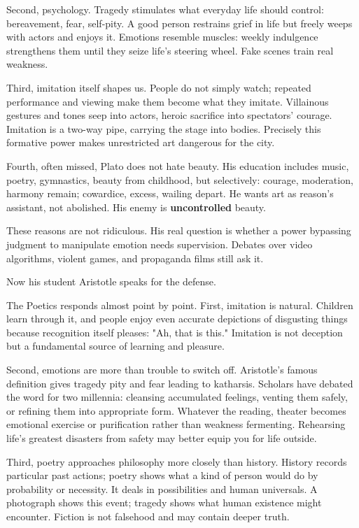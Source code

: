 Second, psychology. Tragedy stimulates what everyday life should control: bereavement, fear, self-pity. A good person restrains grief in life but freely weeps with actors and enjoys it. Emotions resemble muscles: weekly indulgence strengthens them until they seize life's steering wheel. Fake scenes train real weakness.

Third, imitation itself shapes us. People do not simply watch; repeated performance and viewing make them become what they imitate. Villainous gestures and tones seep into actors, heroic sacrifice into spectators' courage. Imitation is a two-way pipe, carrying the stage into bodies. Precisely this formative power makes unrestricted art dangerous for the city.

Fourth, often missed, Plato does not hate beauty. His education includes music, poetry, gymnastics, beauty from childhood, but selectively: courage, moderation, harmony remain; cowardice, excess, wailing depart. He wants art as reason's assistant, not abolished. His enemy is \textbf{uncontrolled} beauty.

These reasons are not ridiculous. His real question is whether a power bypassing judgment to manipulate emotion needs supervision. Debates over video algorithms, violent games, and propaganda films still ask it.

Now his student Aristotle speaks for the defense.

The Poetics responds almost point by point. First, imitation is natural. Children learn through it, and people enjoy even accurate depictions of disgusting things because recognition itself pleases: "Ah, that is this." Imitation is not deception but a fundamental source of learning and pleasure.

Second, emotions are more than trouble to switch off. Aristotle's famous definition gives tragedy pity and fear leading to katharsis. Scholars have debated the word for two millennia: cleansing accumulated feelings, venting them safely, or refining them into appropriate form. Whatever the reading, theater becomes emotional exercise or purification rather than weakness fermenting. Rehearsing life's greatest disasters from safety may better equip you for life outside.

Third, poetry approaches philosophy more closely than history. History records particular past actions; poetry shows what a kind of person would do by probability or necessity. It deals in possibilities and human universals. A photograph shows this event; tragedy shows what human existence might encounter. Fiction is not falsehood and may contain deeper truth.

